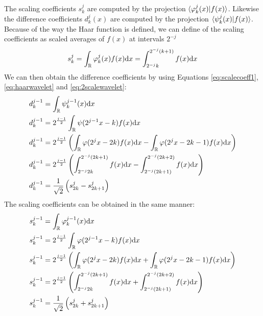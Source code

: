 \documentclass[../master_thesis.tex]{subfiles}
\begin{document}
The scaling coefficients $s^j_k$ are computed by the projection $\braket{\varphi^j_k(x)|f(x)}$.
Likewise the difference coefficients $d^j_k(x)$ are computed by the projection \newline$\braket{\psi^j_k(x)|f(x)}$.
Because of the way the Haar function is defined, we can define of the scaling coefficients as
scaled averages of $f(x)$ at intervals $2^{-j}$ \cite{Sorland, Beylkin:MRA}
\begin{equation}
  s^j_k = \int_{\mathbb{R}}\varphi^j_k(x)f(x)\text{d}x = \int^{2^{-j}(k + 1)}_{2^{-j}k} f(x) \text{d}x\label{eq:scalecoeff1}
\end{equation}
We can then obtain the difference coefficients by using Equations \ref{eq:scalecoeff1}, \ref{eq:haarwavelet} and \ref{eq:2scalewavelet}:
\begin{align}
  \begin{split}\label{eq:diffcoeffint}
    d^{j - 1}_k &= \int_{\mathbb{R}}\psi^{j-1}_k(x)\text{d}x\\
    d^{j - 1}_k &= 2^{\frac{j - 1}{2}}\int_{\mathbb{R}}\psi(2^{j-1}x - k)f(x)\text{d}x\\
    d^{j - 1}_k &= 2^{\frac{j - 1}{2}}\left(\int_{\mathbb{R}}\varphi(2^jx - 2k)f(x)\text{d}x  - \int_{\mathbb{R}}\varphi(2^jx - 2k - 1)f(x)\text{d}x\right)\\
    d^{j - 1}_k &= 2^{\frac{j - 1}{2}}\left( \int^{2^{-j}(2k+1)}_{2^{-j}2k}f(x)\text{d}x - \int^{2^{-j}(2k+2)}_{2^{-j}(2k + 1)}f(x)\text{d}x \right)\\
    d^{j - 1}_k &= \frac{1}{\sqrt{2}}\left(s^{j}_{2k} - s^{j}_{2k+1} \right)
  \end{split}
\end{align}
The scaling coefficients can be obtained in the same manner:
\begin{align}
  \begin{split}\label{eq:scalecoeffint}
    s^{j - 1}_k &= \int_{\mathbb{R}}\varphi^{j-1}_k(x)\text{d}x\\
    s^{j - 1}_k &= 2^{\frac{j - 1}{2}}\int_{\mathbb{R}}\varphi(2^{j-1}x - k)f(x)\text{d}x\\
    s^{j - 1}_k &= 2^{\frac{j - 1}{2}}\left(\int_{\mathbb{R}}\varphi(2^jx - 2k)f(x)\text{d}x  + \int_{\mathbb{R}}\varphi(2^jx - 2k - 1)f(x)\text{d}x\right)\\
    s^{j - 1}_k &= 2^{\frac{j - 1}{2}}\left( \int^{2^{-j}(2k+1)}_{2^{-j}2k}f(x)\text{d}x + \int^{2^{-j}(2k+2)}_{2^{-j}(2k + 1)}f(x)\text{d}x \right)\\
    s^{j - 1}_k &= \frac{1}{\sqrt{2}}\left(s^{j}_{2k} + s^{j}_{2k+1} \right)
  \end{split}
\end{align}
\end{document}
